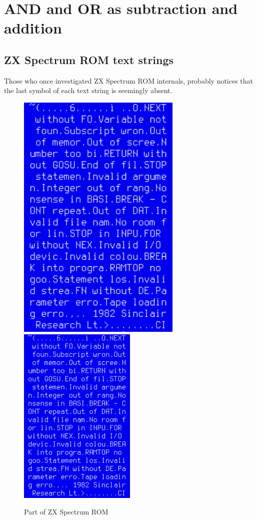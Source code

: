 \section{AND and OR as subtraction and addition}

\subsection{ZX Spectrum ROM text strings}
\label{ZX Spectrum}

Those who once investigated ZX Spectrum \ac{ROM} internals, probably notices that the last symbol of each text string is seemingly
absent.

\begin{figure}[H]
\centering
\ifdefined\ebook
\includegraphics[width=0.7\textwidth]{fundamentals/zx_spectrum_ROM.png}
\else
\includegraphics[width=0.5\textwidth]{fundamentals/zx_spectrum_ROM.png}
\fi
\caption{Part of ZX Spectrum ROM}
\end{figure}

